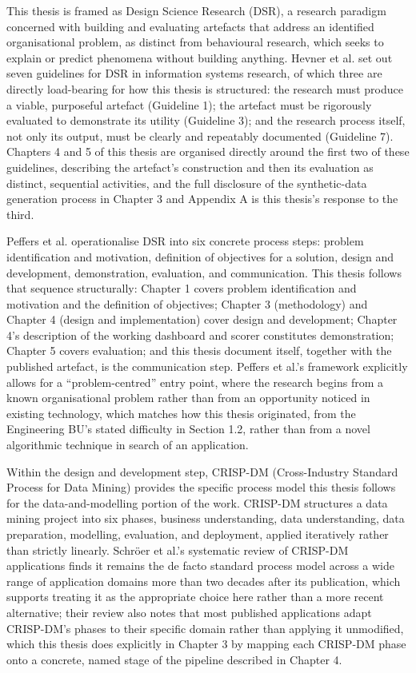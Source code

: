 This thesis is framed as Design Science Research (DSR), a research
paradigm concerned with building and evaluating artefacts that address
an identified organisational problem, as distinct from behavioural
research, which seeks to explain or predict phenomena without building
anything. Hevner et al. \citep{hevner2004design} set out seven
guidelines for DSR in information systems research, of which three are
directly load-bearing for how this thesis is structured: the research
must produce a viable, purposeful artefact (Guideline 1); the artefact
must be rigorously evaluated to demonstrate its utility (Guideline 3);
and the research process itself, not only its output, must be clearly
and repeatably documented (Guideline 7). Chapters 4 and 5 of this thesis
are organised directly around the first two of these guidelines,
describing the artefact's construction and then its evaluation as
distinct, sequential activities, and the full disclosure of the
synthetic-data generation process in Chapter 3 and Appendix A is this
thesis's response to the third.

Peffers et al. \citep{peffers2007design} operationalise DSR into six
concrete process steps: problem identification and motivation,
definition of objectives for a solution, design and development,
demonstration, evaluation, and communication. This thesis follows that
sequence structurally: Chapter 1 covers problem identification and
motivation and the definition of objectives; Chapter 3 (methodology) and
Chapter 4 (design and implementation) cover design and development;
Chapter 4's description of the working dashboard and scorer constitutes
demonstration; Chapter 5 covers evaluation; and this thesis document
itself, together with the published artefact, is the communication step.
Peffers et al.'s framework explicitly allows for a ``problem-centred''
entry point, where the research begins from a known organisational
problem rather than from an opportunity noticed in existing technology,
which matches how this thesis originated, from the Engineering BU's
stated difficulty in Section 1.2, rather than from a novel algorithmic
technique in search of an application.

Within the design and development step, CRISP-DM (Cross-Industry
Standard Process for Data Mining) \citep{chapman2000crispdm} provides
the specific process model this thesis follows for the
data-and-modelling portion of the work. CRISP-DM structures a data
mining project into six phases, business understanding, data
understanding, data preparation, modelling, evaluation, and deployment,
applied iteratively rather than strictly linearly. Schröer et al.'s
systematic review of CRISP-DM applications \citep{schroer2021systematic}
finds it remains the de facto standard process model across a wide range
of application domains more than two decades after its publication,
which supports treating it as the appropriate choice here rather than a
more recent alternative; their review also notes that most published
applications adapt CRISP-DM's phases to their specific domain rather
than applying it unmodified, which this thesis does explicitly in
Chapter 3 by mapping each CRISP-DM phase onto a concrete, named stage of
the pipeline described in Chapter 4.

